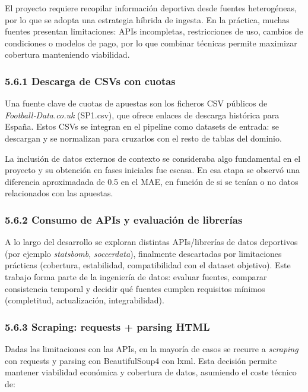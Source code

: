 El proyecto requiere recopilar información deportiva desde fuentes heterogéneas, por lo que se adopta 
una estrategia híbrida de ingesta. En la práctica, muchas fuentes presentan limitaciones: APIs 
incompletas, restricciones de uso, cambios de condiciones o modelos de pago, por lo que combinar 
técnicas permite maximizar cobertura manteniendo viabilidad.

\subsubsection{5.6.1 Descarga de CSVs con cuotas}

Una fuente clave de cuotas de apuestas son los ficheros CSV públicos de \textit{Football‑Data.co.uk} 
(SP1.csv), que ofrece enlaces de descarga histórica para España. Estos CSVs se integran en el 
pipeline como datasets de entrada: se descargan y se normalizan para cruzarlos con el resto de 
tablas del dominio.

La inclusión de datos externos de contexto se consideraba algo fundamental en el proyecto y su obtención
en fases iniciales fue escasa. En esa etapa se observó una diferencia aproximadada de 0.5 en el MAE, en función de si 
se tenían o no datos relacionados con las apuestas.

\subsubsection{5.6.2 Consumo de APIs y evaluación de librerías}

A lo largo del desarrollo se exploran distintas APIs/librerías de datos deportivos (por ejemplo 
\textit{statsbomb}, \textit{soccerdata}), finalmente descartadas por limitaciones prácticas (cobertura, 
estabilidad, compatibilidad con el dataset objetivo). Este trabajo forma parte de la ingeniería de 
datos: evaluar fuentes, comparar consistencia temporal y decidir qué fuentes cumplen requisitos 
mínimos (completitud, actualización, integrabilidad).

\subsubsection{5.6.3 Scraping: requests + parsing HTML}

Dadas las limitaciones con las APIs, en la mayoría de casos se recurre a \textit{scraping} con requests y 
parsing con BeautifulSoup4 con lxml. Esta decisión permite mantener viabilidad económica y cobertura 
de datos, asumiendo el coste técnico de:

